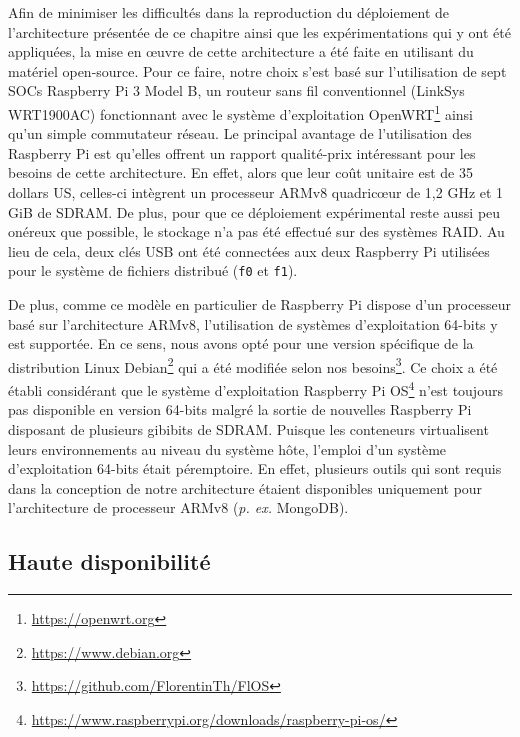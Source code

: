 Afin de minimiser les difficultés dans la reproduction du déploiement de l'architecture présentée de ce chapitre ainsi que les expérimentations qui y ont été appliquées, la mise en \oe{}uvre de cette architecture a été faite en utilisant du matériel open-source. Pour ce faire, notre choix s'est basé sur l'utilisation de sept \acsp{SOC} Raspberry Pi 3 Model B, un routeur sans fil conventionnel (LinkSys WRT1900AC) fonctionnant avec le système d'exploitation OpenWRT\footnote{\url{https://openwrt.org}} ainsi qu'un simple commutateur réseau. Le principal avantage de l'utilisation des Raspberry Pi est qu'elles offrent un rapport qualité-prix intéressant pour les besoins de cette architecture. En effet, alors que leur coût unitaire est de 35 dollars US, celles-ci intègrent un processeur ARMv8 quadric\oe{}ur de 1,2 GHz et 1 GiB de SDRAM. De plus, pour que ce déploiement expérimental reste aussi peu onéreux que possible, le stockage n'a pas été effectué sur des systèmes RAID. Au lieu de cela, deux clés USB ont été connectées aux deux Raspberry Pi utilisées pour le système de fichiers distribué (\texttt{f0} et \texttt{f1}).

De plus, comme ce modèle en particulier de Raspberry Pi dispose d'un processeur basé sur l'architecture ARMv8, l'utilisation de systèmes d'exploitation 64-bits y est supportée. En ce sens, nous avons opté pour une version spécifique de la distribution Linux Debian\footnote{\url{https://www.debian.org}} qui a été modifiée selon nos besoins\footnote{\url{https://github.com/FlorentinTh/FlOS}}. Ce choix a été établi considérant que le système d'exploitation Raspberry Pi OS\footnote{\url{https://www.raspberrypi.org/downloads/raspberry-pi-os/}} n'est toujours pas disponible en version 64-bits malgré la sortie de nouvelles Raspberry Pi disposant de plusieurs gibibits de SDRAM. Puisque les conteneurs virtualisent leurs environnements au niveau du système hôte, l'emploi d'un système d'exploitation 64-bits était péremptoire. En effet, plusieurs outils qui sont requis dans la conception de notre architecture étaient disponibles uniquement pour l'architecture de processeur ARMv8 (\textit{p. ex.} MongoDB).

\subsection{Haute disponibilité}

